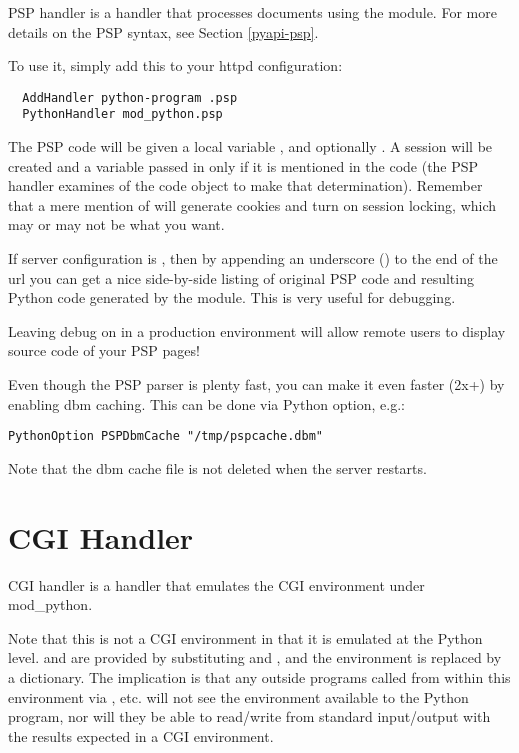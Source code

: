 PSP handler is a handler that processes documents using the
 module. For more details on the PSP syntax, see
Section \ref{pyapi-psp}.

To use it, simply add this to your httpd configuration: 

\begin{verbatim}
  AddHandler python-program .psp
  PythonHandler mod_python.psp
\end{verbatim}

The PSP code will be given a local variable , and optionally
. A session will be created and a 
variable passed in only if it is mentioned in the code (the PSP
handler examines  of the code object to make that
determination). Remember that a mere mention of  will
generate cookies and turn on session locking, which may or may not be
what you want.

If  server configuration is , then by
appending an underscore (\samp{_}) to the end of the url you can get a
nice side-by-side listing of original PSP code and resulting Python
code generated by the  module. This is very useful for
debugging.

\begin{notice}
Leaving debug on in a production environment will allow remote users
to display source code of your PSP pages!
\end{notice}

Even though the PSP parser is plenty fast, you can make it even faster
(2x+) by enabling dbm caching. This can be done via 
Python option, e.g.:
\begin{verbatim}
PythonOption PSPDbmCache "/tmp/pspcache.dbm"
\end{verbatim}
Note that the dbm cache file is not deleted when the server restarts.

\section{CGI Handler\label{hand-cgi}}


CGI handler is a handler that emulates the CGI environment under mod_python. 

Note that this is not a  CGI environment in that it is
emulated at the Python level.  and  are
provided by substituting  and , and
the environment is replaced by a dictionary. The implication is that
any outside programs called from within this environment via
, etc. will not see the environment available to the
Python program, nor will they be able to read/write from standard
input/output with the results expected in a  CGI environment.

